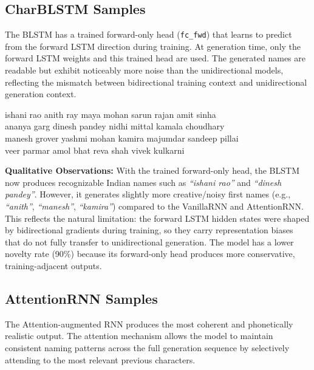 \documentclass[11pt,a4paper]{article}
\begin{document}
\subsection{CharBLSTM Samples}

\begin{infoBox}
The BLSTM has a trained forward-only head (\texttt{fc\_fwd}) that learns to predict from the forward LSTM direction during training. At generation time, only the forward LSTM weights and this trained head are used. The generated names are readable but exhibit noticeably more noise than the unidirectional models, reflecting the mismatch between bidirectional training context and unidirectional generation context.
\end{infoBox}

\begin{codeBox}[CharBLSTM Generated Names (Temperature = 0.8)]
ishani rao \quad anith ray \quad maya mohan \quad sarun rajan \quad amit sinha \\
ananya garg \quad dinesh pandey \quad nidhi mittal \quad kamala choudhary \\
manesh grover \quad yashmi mohan \quad kamira majumdar \quad sandeep pillai \\
veer parmar \quad amol bhat \quad reva shah \quad vivek kulkarni
\end{codeBox}

\vspace{0.5em}
\textbf{Qualitative Observations:} With the trained forward-only head, the BLSTM now produces recognizable Indian names such as \textit{``ishani rao''} and \textit{``dinesh pandey''}. However, it generates slightly more creative/noisy first names (e.g., \textit{``anith''}, \textit{``manesh''}, \textit{``kamira''}) compared to the VanillaRNN and AttentionRNN. This reflects the natural limitation: the forward LSTM hidden states were shaped by bidirectional gradients during training, so they carry representation biases that do not fully transfer to unidirectional generation. The model has a lower novelty rate (90\%) because its forward-only head produces more conservative, training-adjacent outputs.

\subsection{AttentionRNN Samples}
The Attention-augmented RNN produces the most coherent and phonetically realistic output. The attention mechanism allows the model to maintain consistent naming patterns across the full generation sequence by selectively attending to the most relevant previous characters.
\end{document}
